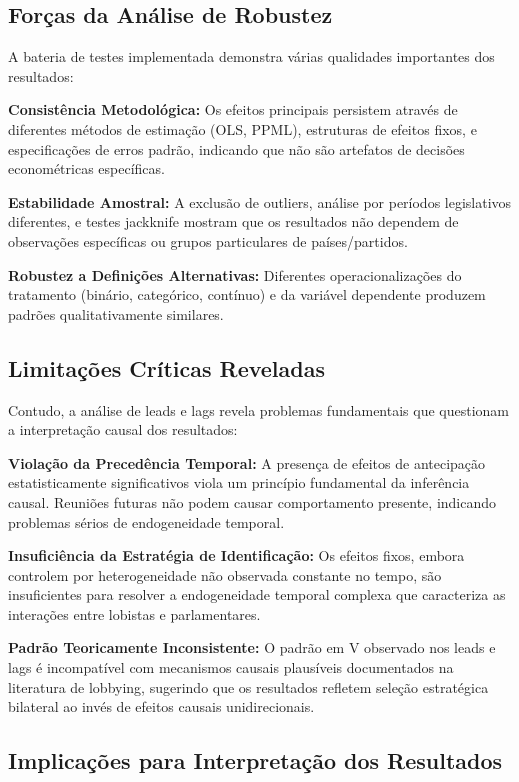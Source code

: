 \subsection{Forças da Análise de Robustez}

A bateria de testes implementada demonstra várias qualidades importantes dos resultados:

\textbf{Consistência Metodológica:} Os efeitos principais persistem através de diferentes métodos de estimação (OLS, PPML), estruturas de efeitos fixos, e especificações de erros padrão, indicando que não são artefatos de decisões econométricas específicas.

\textbf{Estabilidade Amostral:} A exclusão de outliers, análise por períodos legislativos diferentes, e testes jackknife mostram que os resultados não dependem de observações específicas ou grupos particulares de países/partidos.

\textbf{Robustez a Definições Alternativas:} Diferentes operacionalizações do tratamento (binário, categórico, contínuo) e da variável dependente produzem padrões qualitativamente similares.

\subsection{Limitações Críticas Reveladas}

Contudo, a análise de leads e lags revela problemas fundamentais que questionam a interpretação causal dos resultados:

\textbf{Violação da Precedência Temporal:} A presença de efeitos de antecipação estatisticamente significativos viola um princípio fundamental da inferência causal. Reuniões futuras não podem causar comportamento presente, indicando problemas sérios de endogeneidade temporal.

\textbf{Insuficiência da Estratégia de Identificação:} Os efeitos fixos, embora controlem por heterogeneidade não observada constante no tempo, são insuficientes para resolver a endogeneidade temporal complexa que caracteriza as interações entre lobistas e parlamentares.

\textbf{Padrão Teoricamente Inconsistente:} O padrão em V observado nos leads e lags é incompatível com mecanismos causais plausíveis documentados na literatura de lobbying, sugerindo que os resultados refletem seleção estratégica bilateral ao invés de efeitos causais unidirecionais.

\subsection{Implicações para Interpretação dos Resultados}

